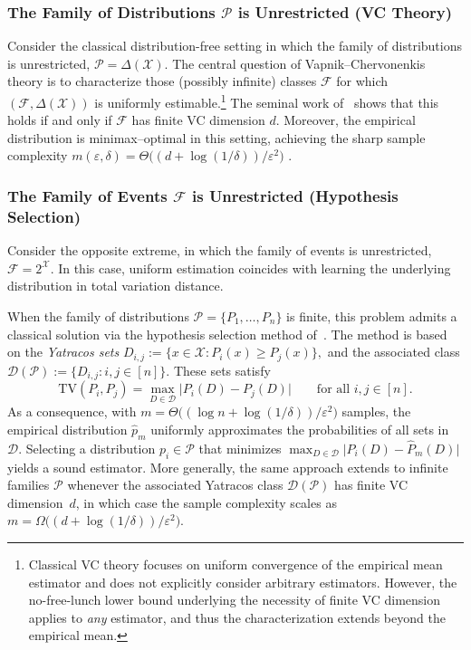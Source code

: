 \documentclass[arxiv]{colt2026}
\newcommand{\X}{\mathcal{X}}
\newcommand{\F}{\mathcal{F}}
\newcommand{\D}{\mathcal{D}}
\newcommand{\Pc}{\mathcal{P}}
\newcommand{\TV}{\mathrm{TV}}
\begin{document}
\subsubsection*{The Family of Distributions $\Pc$ is Unrestricted (VC Theory)}

Consider the classical distribution-free setting in which the family of distributions is unrestricted, $\Pc = \Delta(\X)$.
The central question of Vapnik--Chervonenkis theory is to characterize those (possibly infinite) classes $\F$ for which $(\F, \Delta(\X))$ is uniformly estimable.\footnote{%
Classical VC theory focuses on uniform convergence of the empirical mean estimator and does not explicitly consider arbitrary estimators.
However, the no-free-lunch lower bound underlying the necessity of finite VC dimension applies to \emph{any} estimator, and thus the characterization extends beyond the empirical mean.}
The seminal work of~\cite{vapnik1971} shows that this holds if and only if $\F$ has finite VC dimension $d$.
Moreover, the empirical distribution is minimax--optimal in this setting, achieving the sharp sample complexity
\(
m(\varepsilon,\delta) = \Theta\bigl((d + \log(1/\delta))/\varepsilon^2\bigr)
\)
\citep{blumer1989,talagrand1994}.

\vspace{-1em}
\subsubsection*{The Family of Events $\F$ is Unrestricted (Hypothesis Selection)}

Consider the opposite extreme, in which the family of events is unrestricted, $\F = 2^{\X}$.
In this case, uniform estimation coincides with learning the underlying distribution in total variation distance.

When the family of distributions $\Pc = \{P_1,\ldots,P_n\}$ is finite, this problem admits a classical solution via the hypothesis selection method of~\cite{yatracos1985}.
The method is based on the \emph{Yatracos sets}
\(
D_{i,j} := \{x \in \X : P_i(x) \ge P_j(x)\},
\)
and the associated class $\D(\Pc) := \{D_{i,j} : i,j \in [n]\}$.
These sets satisfy
\[
\TV(P_i,P_j) = \max_{D \in \D} \bigl| P_i(D) - P_j(D) \bigr|
\qquad\text{for all } i,j \in [n].
\]
As a consequence, with
\(m = \Theta\bigl((\log n + \log(1/\delta))/\varepsilon^2\bigr)\)
samples, the empirical distribution $\hat p_m$ uniformly approximates the probabilities of all sets in $\D$.
Selecting a distribution $p_i \in \Pc$ that minimizes 
$\max_{D \in \D} \bigl| P_i(D) - \hat P_m(D) \bigr|$ yields a sound estimator.
More generally, the same approach extends to infinite families $\Pc$ whenever the associated Yatracos class $\D(\Pc)$ has finite VC dimension~$d$, in which case the sample complexity scales as
\(m = \Omega\bigl((d + \log(1/\delta))/\varepsilon^2\bigr).\) 
\end{document}
